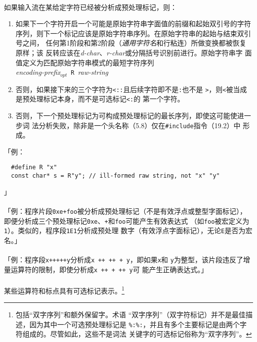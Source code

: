 \paragraph{}
如果输入流在某给定字符已经被分析成预处理标记，则：
\begin{enumerate}
  \item{如果下一个字符开启一个可能是原始字符串字面值的前缀和起始双引号的字符
    序列，则下一个标记应该是原始字符串序列。在原始字符串的起始与结束双引号之间，
    任何第1阶段和第2阶段（\textit{通用字符名}和行粘连）所做变换都被恢复原样；该
    反转应该在\textit{d-char}、\textit{r-char}或分隔括号识别前进行。原始字符串字
    面值定义为匹配原始字符串模式的最短字符序列 \\
    \mbox{\qquad \textit{encoding-prefix}$_{opt}$ \texttt{R}
    \textit{raw-string}}}
  \item{否则，如果接下来的三个字符为\texttt{<::}且后续字符即不是\texttt{:}也不是
    \texttt{>}，则\texttt{<}被当成是预处理标记本身，而不是可选标记\texttt{<:}的
    第一个字符。}
  \item{否则，下一个预处理标记为可构成预处理标记的最长序列，即使这可能使进一步词
    法分析失败，除非是一个头名称（5.8）仅在\texttt{\#include}指令（19.2）中
    形成。}
\end{enumerate}
「例：
\begin{lstlisting}
  #define R "x"
  const char* s = R"y"; // ill-formed raw string, not "x" "y"
\end{lstlisting}」

\paragraph{}
「例：程序片段\texttt{0xe+foo}被分析成预处理标记（不是有效浮点或整型字面标记），
即便分析成三个预处理标记\texttt{0xe}、\texttt{+}和\texttt{foo}可能产生有效表达式
（如\texttt{foo}被宏定义为\texttt{1}）。类似的，程序段\texttt{1E1}分析成预处理
数字（有效浮点字面标记），无论\texttt{E}是否为宏名。」

\paragraph{}
「例：程序段\texttt{x+++++y}分析成\texttt{x ++ ++ + y}，即如果\texttt{x}和
\texttt{y}为整型，该片段违反了增量运算符的限制，即使分析成\texttt{x ++ + ++ y}可
能产生正确表达式。」

\paragraph{}
某些运算符和标点具有可选标记表示。\footnote{包括``双字序列''和额外保留字。术语
``双字序列''（双字符标记）并不是最佳描述，因为其中一个可选预处理标记是
\texttt{\%:\%:}，并且有多个主要标记是由两个字符组成的。尽管如此，这些不是词法
关键字的可选标记俗称为``双字序列''。}

